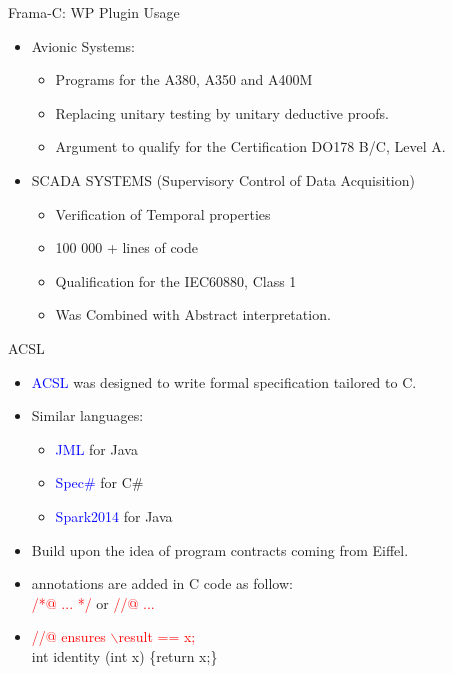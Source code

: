 \begin{frame}{Frama-C: WP Plugin Usage}
\begin{itemize}
	\item Avionic Systems:
	\begin{itemize}
		\item Programs for the A380, A350 and A400M
		\item Replacing unitary testing by unitary deductive proofs.
		\item Argument to qualify for the Certification DO178 B/C, Level A.
	\end{itemize}
\item SCADA SYSTEMS (Supervisory Control of Data Acquisition)
\begin{itemize}
	\item Verification of Temporal properties
	\item 100 000 + lines of code
	\item Qualification for the IEC60880, Class 1
	\item Was Combined with Abstract interpretation.
\end{itemize}
\end{itemize}
\end{frame}

\begin{frame}{ACSL}
\begin{itemize}
	\item \textcolor{blue}{ACSL} was designed to write formal specification tailored to C.
	\item Similar languages:
	\begin{itemize}
		\item  \textcolor{blue}{JML} for Java
	    \item  \textcolor{blue}{Spec\#} for C\#
	    \item  \textcolor{blue}{Spark2014} for Java
	\end{itemize}
\item Build upon the idea of program contracts coming from Eiffel.
\item annotations are added in C code as follow:\\
\textcolor{red}{/*@ ... */} or \textcolor{red}{//@ ... }
\item \textcolor{red}{//@ ensures $\backslash$result == x;}\\
int identity (int x) \{return x;\}
\end{itemize}
\end{frame}

